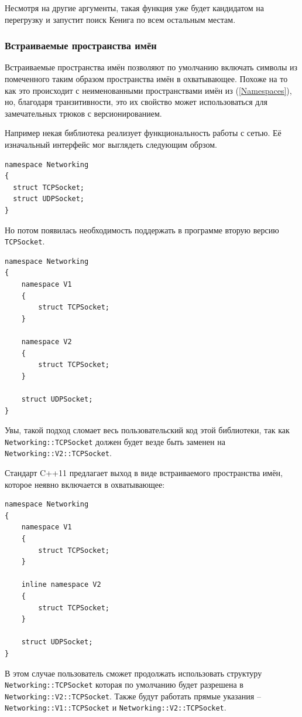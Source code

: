 \documentclass[a4paper,12pt,oneside]{article}
\begin{document}
Несмотря на другие аргументы, такая функция уже будет кандидатом на перегрузку и запустит поиск Кенига по всем остальным местам.

\subsubsection{Встраиваемые пространства имён}\label{InlineNameSpaces}

Встраиваемые пространства имён позволяют по умолчанию включать символы из помеченного таким образом пространства имён в охватывающее. Похоже на то как это происходит с неименованными пространствами имён из (\ref{Namespaces}), но, благодаря транзитивности, это их свойство может использоваться для замечательных трюков с версионированием.

Например некая библиотека реализует функциональность работы с сетью. Её изначальный интерфейс мог выглядеть следующим обрзом.

\begin{lstlisting}
namespace Networking 
{
  struct TCPSocket;
  struct UDPSocket;
}
\end{lstlisting}

Но потом появилась необходимость поддержать в программе вторую версию \lstinline!TCPSocket!.

\begin{lstlisting}
namespace Networking 
{
    namespace V1 
    {
        struct TCPSocket;
    }
     
    namespace V2 
    {
        struct TCPSocket;
    }
 
    struct UDPSocket;
}
\end{lstlisting}

Увы, такой подход сломает весь пользовательский код этой библиотеки, так как \lstinline!Networking::TCPSocket! должен будет везде быть заменен на \lstinline!Networking::V2::TCPSocket!.

Стандарт C++11 предлагает выход в виде встраиваемого пространства имён, которое неявно включается в охватывающее:

\begin{lstlisting}
namespace Networking 
{
    namespace V1 
    {
        struct TCPSocket;
    }
     
    inline namespace V2 
    {
        struct TCPSocket;
    }
 
    struct UDPSocket;
}
\end{lstlisting}

В этом случае пользователь сможет продолжать использовать структуру \lstinline!Networking::TCPSocket! которая по умолчанию будет разрешена в \lstinline!Networking::V2::TCPSocket!. Также будут работать прямые указания -- \lstinline!Networking::V1::TCPSocket! и \lstinline!Networking::V2::TCPSocket!.
\end{document}

